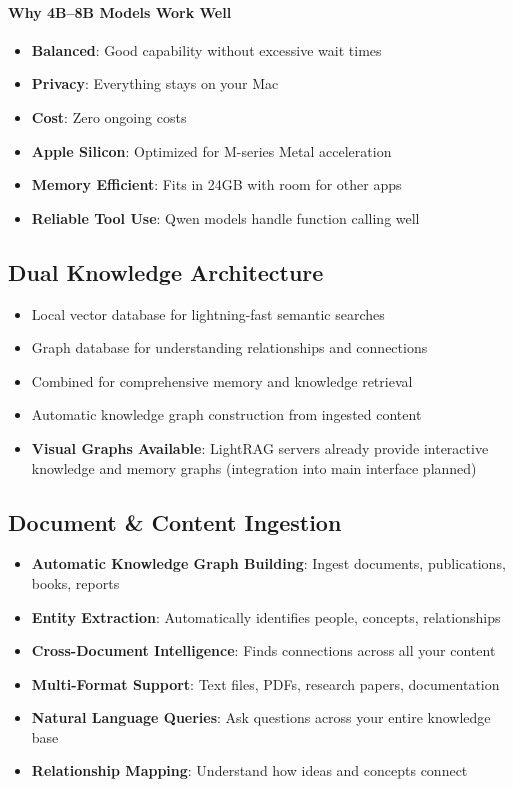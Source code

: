 \documentclass[11pt,letterpaper]{article}
\begin{document}
\paragraph{Why 4B--8B Models Work Well}
\begin{itemize}[leftmargin=*]
    \item \textbf{Balanced}: Good capability without excessive wait times
    \item \textbf{Privacy}: Everything stays on your Mac
    \item \textbf{Cost}: Zero ongoing costs
    \item \textbf{Apple Silicon}: Optimized for M-series Metal acceleration
    \item \textbf{Memory Efficient}: Fits in 24GB with room for other apps
    \item \textbf{Reliable Tool Use}: Qwen models handle function calling well
\end{itemize}

\subsection{Dual Knowledge Architecture}
\begin{itemize}[leftmargin=*]
    \item Local vector database for lightning-fast semantic searches
    \item Graph database for understanding relationships and connections
    \item Combined for comprehensive memory and knowledge retrieval
    \item Automatic knowledge graph construction from ingested content
    \item \textbf{Visual Graphs Available}: LightRAG servers already provide interactive knowledge and memory graphs (integration into main interface planned)
\end{itemize}

\subsection{Document \& Content Ingestion}
\begin{itemize}[leftmargin=*]
    \item \textbf{Automatic Knowledge Graph Building}: Ingest documents, publications, books, reports
    \item \textbf{Entity Extraction}: Automatically identifies people, concepts, relationships
    \item \textbf{Cross-Document Intelligence}: Finds connections across all your content
    \item \textbf{Multi-Format Support}: Text files, PDFs, research papers, documentation
    \item \textbf{Natural Language Queries}: Ask questions across your entire knowledge base
    \item \textbf{Relationship Mapping}: Understand how ideas and concepts connect
\end{itemize}
\end{document}
